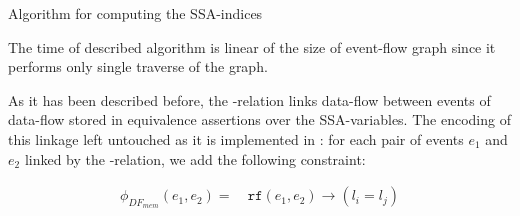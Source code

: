\begin{algorithm}
    \caption{Algorithm for computing the SSA-indices}\label{alg:compute-ssa}
    \begin{algorithmic}[1]
                         
                        \EndIf
                    \EndFor
                \EndFor
            \EndFor
        \EndFunction
    \end{algorithmic}
    \label{algorithm:ssa-map}
\end{algorithm}

The time of described algorithm is linear of the size of event-flow graph since it performs only single traverse of the graph.

As it has been described before, the \rf-relation links data-flow between events %
of data-flow stored in equivalence assertions over the SSA-variables. 
The encoding of this linkage left untouched as it is implemented in \Porthos: for each pair of events $e_1$ and $e_2$ linked by the \rf-relation, we add the following constraint:

\begin{align}
\phi_{DF_{mem}}(e_1, e_2) = \ & \mathtt{rf}(e_1, e_2) \rightarrow (l_i = l_j) 
\end{align}


